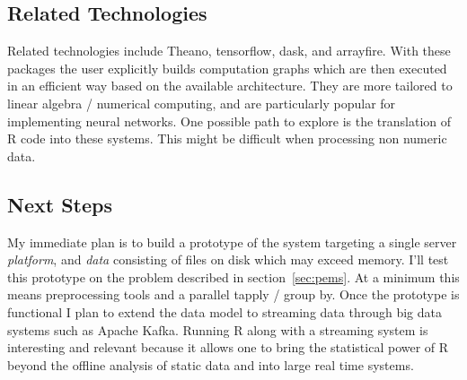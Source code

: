 \documentclass[12pt]{article}
\begin{document}
\subsection{Related Technologies}

Related technologies include Theano, tensorflow, dask, and arrayfire. With
these packages the user explicitly builds computation graphs which are then
executed in an efficient way based on the available architecture. They are
more tailored to linear algebra / numerical computing, and are particularly
popular for implementing neural networks. One possible path to explore is
the translation of R code into these systems. This might be difficult when
processing non numeric data.

\subsection{Next Steps}

My immediate plan is to build a prototype of the system targeting a single
server \emph{platform}, and \emph{data} consisting of files on disk which
may exceed memory. I'll test this prototype on the problem described in
section~\ref{sec:pems}. At a minimum this means preprocessing tools
and a parallel tapply / group by.  Once the prototype is functional
I plan to extend the data model to streaming data through big data systems
such as Apache Kafka. Running R along with a streaming system is
interesting and relevant because it allows one to bring the statistical
power of R beyond the offline analysis of static data and into large real
time systems. 


 
\end{document}
